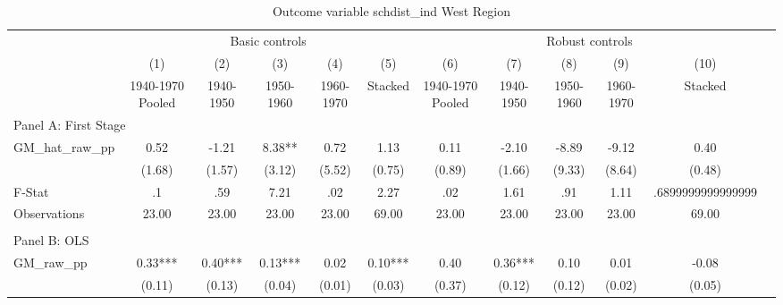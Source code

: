  \begin{table}[htbp]\centering {} \begin{threeparttable} \caption{Outcome variable schdist\_ind West Region} \begin{tabular}{l*{11}{c}} \toprule
          &\multicolumn{5}{c}{Basic controls}                                   &\multicolumn{5}{c}{Robust controls}                                  \\\cmidrule(lr){2-6}\cmidrule(lr){7-11}
          &\multicolumn{1}{c}{(1)}&\multicolumn{1}{c}{(2)}&\multicolumn{1}{c}{(3)}&\multicolumn{1}{c}{(4)}&\multicolumn{1}{c}{(5)}&\multicolumn{1}{c}{(6)}&\multicolumn{1}{c}{(7)}&\multicolumn{1}{c}{(8)}&\multicolumn{1}{c}{(9)}&\multicolumn{1}{c}{(10)}\\
          &\multicolumn{1}{c}{1940-1970 Pooled}&\multicolumn{1}{c}{1940-1950}&\multicolumn{1}{c}{1950-1960}&\multicolumn{1}{c}{1960-1970}&\multicolumn{1}{c}{Stacked}&\multicolumn{1}{c}{1940-1970 Pooled}&\multicolumn{1}{c}{1940-1950}&\multicolumn{1}{c}{1950-1960}&\multicolumn{1}{c}{1960-1970}&\multicolumn{1}{c}{Stacked}\\
\cmidrule(lr){1-11}
\multicolumn{10}{l}{Panel A: First Stage}\\
\cmidrule(lr){1-11}
GM\_hat\_raw\_pp&      0.52   &     -1.21   &      8.38** &      0.72   &      1.13   &      0.11   &     -2.10   &     -8.89   &     -9.12   &      0.40   \\
          &    (1.68)   &    (1.57)   &    (3.12)   &    (5.52)   &    (0.75)   &    (0.89)   &    (1.66)   &    (9.33)   &    (8.64)   &    (0.48)   \\
\midrule
F-Stat    &        .1   &       .59   &      7.21   &       .02   &      2.27   &       .02   &      1.61   &       .91   &      1.11   &.6899999999999999   \\
Observations&     23.00   &     23.00   &     23.00   &     23.00   &     69.00   &     23.00   &     23.00   &     23.00   &     23.00   &     69.00   \\
\cmidrule[\heavyrulewidth](lr){1-11} \\ \cmidrule[\heavyrulewidth](lr){1-11}
\multicolumn{10}{l}{Panel B: OLS}\\
\cmidrule(lr){1-11}
GM\_raw\_pp &      0.33***&      0.40***&      0.13***&      0.02   &      0.10***&      0.40   &      0.36***&      0.10   &      0.01   &     -0.08   \\
          &    (0.11)   &    (0.13)   &    (0.04)   &    (0.01)   &    (0.03)   &    (0.37)   &    (0.12)   &    (0.12)   &    (0.02)   &    (0.05)   \\

\end{tabular}
\end{threeparttable}
\end{table}
